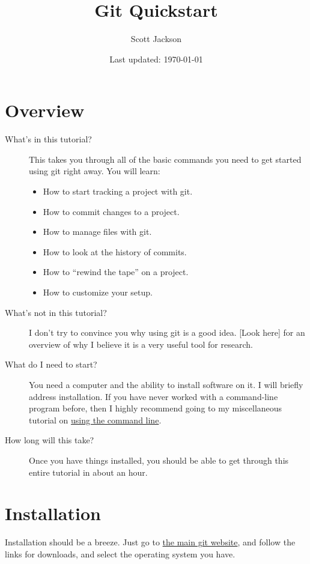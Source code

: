 \documentclass{article}
\title{Git Quickstart}
\author{Scott Jackson}
\date{Last updated: \today}
\begin{document}
\maketitle

\setcounter{tocdepth}{3}
\tableofcontents
\vspace*{1cm}


\newpage
\section{Overview}
\label{sec-1}

\begin{description}
\item[What's in this tutorial?] This takes you through all of the basic commands you need to get started using git right away. You will learn:
\begin{itemize}
\item How to start tracking a project with git.
\item How to commit changes to a project.
\item How to manage files with git.
\item How to look at the history of commits.
\item How to ``rewind the tape'' on a project.
\item How to customize your setup.
\end{itemize}
\item[What's not in this tutorial?] I don't try to convince you why using git is a good idea.  [Look here] for an overview of why I believe it is a very useful tool for research.
\item[What do I need to start?] You need a computer and the ability to install software on it. I will briefly address installation.  If you have never worked with a command-line program before, then I highly recommend going to my miscellaneous tutorial on \href{https://github.com/shoestringpsycholing/rrr_tools/misc_tutorials/}{using the command line}.
\item[How long will this take?] Once you have things installed, you should be able to get through this entire tutorial in about an hour.
\end{description}
\section{Installation}
\label{sec-2}

Installation should be a breeze. Just go to \href{http://git-scm.com}{the main git website}, and follow the links for downloads, and select the operating system you have.
\end{document}
